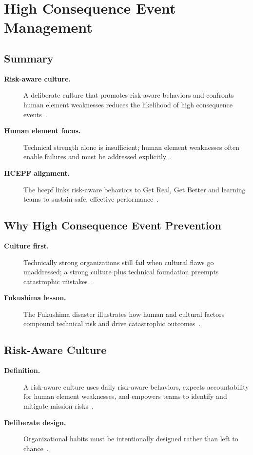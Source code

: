 \documentclass[../main.tex]{subfiles}
\begin{document}
\section{High Consequence Event Management}

\subsection{Summary}
\begin{description}
  \item[\textbf{Risk-aware culture.}] A deliberate culture that promotes risk-aware behaviors and confronts human element weaknesses reduces the likelihood of high consequence events~\autocite{edo-5-1-10-hce-management-2025}.
  \item[\textbf{Human element focus.}] Technical strength alone is insufficient; human element weaknesses often enable failures and must be addressed explicitly~\autocite{edo-5-1-10-hce-management-2025}.
  \item[\textbf{HCEPF alignment.}] The \ac{hcepf} links risk-aware behaviors to Get Real, Get Better and learning teams to sustain safe, effective performance~\autocite{edo-5-1-10-hce-management-2025}.
\end{description}

\subsection{Why High Consequence Event Prevention}
\begin{description}
  \item[\textbf{Culture first.}] Technically strong organizations still fail when cultural flaws go unaddressed; a strong culture plus technical foundation preempts catastrophic mistakes~\autocite{edo-5-1-10-hce-management-2025}.
  \item[\textbf{Fukushima lesson.}] The Fukushima disaster illustrates how human and cultural factors compound technical risk and drive catastrophic outcomes~\autocite{edo-5-1-10-hce-management-2025}.
\end{description}

\subsection{Risk-Aware Culture}
\begin{description}
  \item[\textbf{Definition.}] A risk-aware culture uses daily risk-aware behaviors, expects accountability for human element weaknesses, and empowers teams to identify and mitigate mission risks~\autocite{edo-5-1-10-hce-management-2025}.
  \item[\textbf{Deliberate design.}] Organizational habits must be intentionally designed rather than left to chance~\autocite{edo-5-1-10-hce-management-2025}.
\end{description}
\end{document}
